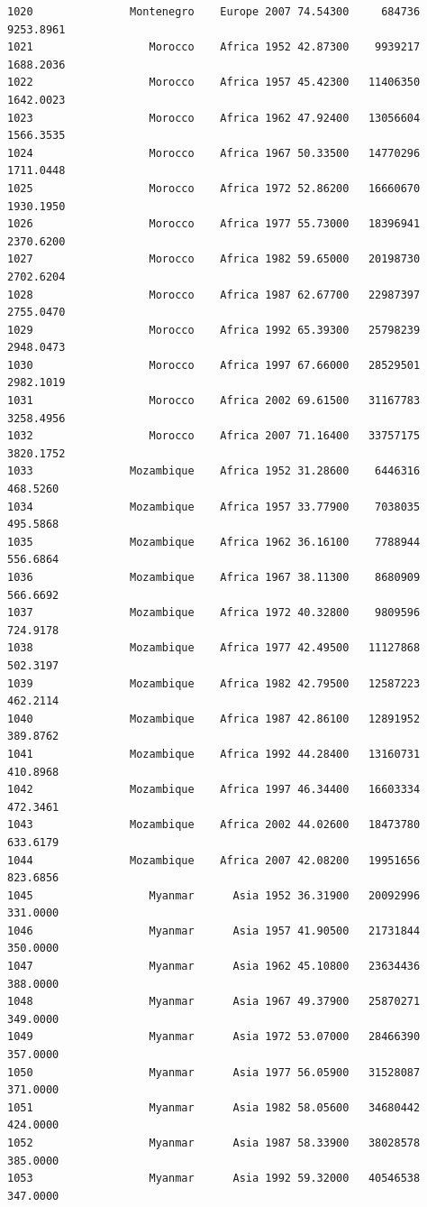 \documentclass[
  letterpaper,
  DIV=11,
  numbers=noendperiod]{scrreprt}
\begin{document}
\begin{verbatim}
1020               Montenegro    Europe 2007 74.54300     684736   9253.8961
1021                  Morocco    Africa 1952 42.87300    9939217   1688.2036
1022                  Morocco    Africa 1957 45.42300   11406350   1642.0023
1023                  Morocco    Africa 1962 47.92400   13056604   1566.3535
1024                  Morocco    Africa 1967 50.33500   14770296   1711.0448
1025                  Morocco    Africa 1972 52.86200   16660670   1930.1950
1026                  Morocco    Africa 1977 55.73000   18396941   2370.6200
1027                  Morocco    Africa 1982 59.65000   20198730   2702.6204
1028                  Morocco    Africa 1987 62.67700   22987397   2755.0470
1029                  Morocco    Africa 1992 65.39300   25798239   2948.0473
1030                  Morocco    Africa 1997 67.66000   28529501   2982.1019
1031                  Morocco    Africa 2002 69.61500   31167783   3258.4956
1032                  Morocco    Africa 2007 71.16400   33757175   3820.1752
1033               Mozambique    Africa 1952 31.28600    6446316    468.5260
1034               Mozambique    Africa 1957 33.77900    7038035    495.5868
1035               Mozambique    Africa 1962 36.16100    7788944    556.6864
1036               Mozambique    Africa 1967 38.11300    8680909    566.6692
1037               Mozambique    Africa 1972 40.32800    9809596    724.9178
1038               Mozambique    Africa 1977 42.49500   11127868    502.3197
1039               Mozambique    Africa 1982 42.79500   12587223    462.2114
1040               Mozambique    Africa 1987 42.86100   12891952    389.8762
1041               Mozambique    Africa 1992 44.28400   13160731    410.8968
1042               Mozambique    Africa 1997 46.34400   16603334    472.3461
1043               Mozambique    Africa 2002 44.02600   18473780    633.6179
1044               Mozambique    Africa 2007 42.08200   19951656    823.6856
1045                  Myanmar      Asia 1952 36.31900   20092996    331.0000
1046                  Myanmar      Asia 1957 41.90500   21731844    350.0000
1047                  Myanmar      Asia 1962 45.10800   23634436    388.0000
1048                  Myanmar      Asia 1967 49.37900   25870271    349.0000
1049                  Myanmar      Asia 1972 53.07000   28466390    357.0000
1050                  Myanmar      Asia 1977 56.05900   31528087    371.0000
1051                  Myanmar      Asia 1982 58.05600   34680442    424.0000
1052                  Myanmar      Asia 1987 58.33900   38028578    385.0000
1053                  Myanmar      Asia 1992 59.32000   40546538    347.0000

\end{verbatim}
\end{document}
